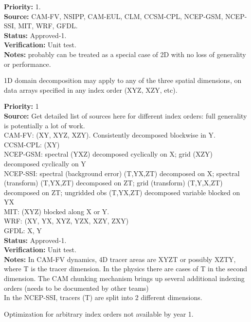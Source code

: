 \begin{reqlist}
{\bf Priority:} 1.\\ 
{\bf Source:} CAM-FV, NSIPP, CAM-EUL, CLM, CCSM-CPL, NCEP-GSM, NCEP-SSI, MIT, WRF, GFDL. \\
{\bf Status:} Approved-1. \\
{\bf Verification:} Unit test. \\
{\bf Notes:} probably can be treated as a special case of 2D with no
  loss of generality or performance.
\end{reqlist}


1D domain decomposition may apply to any of the three spatial
dimensions, on data arrays specified in any index order (XYZ, XZY,
etc).

\begin{reqlist}
{\bf Priority:} 1 \\
{\bf Source:} Get detailed list of sources here for different index
  orders: full generality is potentially a lot of work. \\
 CAM-FV: (XY, XYZ, XZY).  Consistently decomposed blockwise in Y. \\
 CCSM-CPL: (XY) \\
 NCEP-GSM: spectral (YXZ) decomposed cyclically on X;
           grid (XZY) decomposed cyclically on Y \\
 NCEP-SSI: spectral (background error) (T,YX,ZT) decomposed on X;
           spectral (transform) (T,YX,ZT) decomposed on ZT;
           grid (transform) (T,Y,X,ZT) decomposed on ZT;
           ungridded obs (T,YX,ZT) decomposed variable blocked on YX \\
 MIT: (XYZ) blocked along X or Y. \\
 WRF: (XY, YX, XYZ, YZX, XZY, ZXY) \\
 GFDL: X, Y \\
{\bf Status:} Approved-1. \\
{\bf Verification:} Unit test. \\
{\bf Notes:}  In CAM-FV dynamics, 4D tracer areas are XYZT or
        possibly XZTY, where T is the tracer dimension.  In the physics
        there are cases of T in the second dimension.  The CAM
        chunking mechanism brings up several additional indexing
        orders (needs to be documented by other teams) \\
        In the NCEP-SSI, tracers (T) are split into 2 different
        dimensions.

        Optimization for arbitrary index orders not available by year 1.
\end{reqlist}

